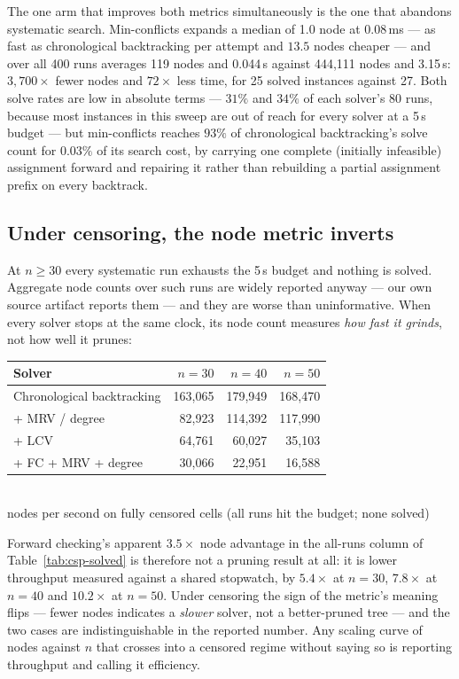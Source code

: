 The one arm that improves both metrics simultaneously is the one that abandons systematic search.
Min-conflicts expands a median of 1.0 node at 0.08\,ms --- as fast as chronological backtracking
per attempt and $13.5$ nodes cheaper --- and over all 400 runs averages 119 nodes and 0.044\,s
against 444,111 nodes and 3.15\,s: $3{,}700\times$ fewer nodes and $72\times$ less time, for
25 solved instances against 27. Both solve rates are low in absolute terms --- $31\%$ and $34\%$ of
each solver's 80 runs, because most instances in this sweep are out of reach for every solver at a
5\,s budget --- but min-conflicts reaches $93\%$ of chronological backtracking's solve count for $0.03\%$ of its
search cost, by carrying one complete (initially infeasible) assignment forward and repairing it
rather than rebuilding a partial assignment prefix on every backtrack.

\subsection{Under censoring, the node metric inverts}

At $n \geq 30$ every systematic run exhausts the 5\,s budget and nothing is solved. Aggregate node
counts over such runs are widely reported anyway --- our own source artifact reports them --- and
they are worse than uninformative. When every solver stops at the same clock, its node count
measures \emph{how fast it grinds}, not how well it prunes:

\begin{center}
\small
\begin{tabular}{@{}lrrr@{}}
\toprule
\textbf{Solver} & \textbf{$n=30$} & \textbf{$n=40$} & \textbf{$n=50$} \\
\midrule
Chronological backtracking & 163,065 & 179,949 & 168,470 \\
\quad + MRV / degree       & \phantom{0}82,923 & 114,392 & 117,990 \\
\quad + LCV                & \phantom{0}64,761 & \phantom{0}60,027 & \phantom{0}35,103 \\
\quad + FC + MRV + degree  & \phantom{0}30,066 & \phantom{0}22,951 & \phantom{0}16,588 \\
\bottomrule
\end{tabular}
\\[2pt]
\footnotesize nodes per second on fully censored cells (all runs hit the budget; none solved)
\end{center}

Forward checking's apparent $3.5\times$ node advantage in the all-runs column of
Table~\ref{tab:csp-solved} is therefore not a pruning result at all: it is lower throughput
measured against a shared stopwatch, by $5.4\times$ at $n = 30$, $7.8\times$ at $n = 40$ and
$10.2\times$ at $n = 50$. Under censoring the sign of the metric's meaning
flips --- fewer nodes indicates a \emph{slower} solver, not a better-pruned tree --- and the two
cases are indistinguishable in the reported number. Any scaling curve of nodes against $n$ that
crosses into a censored regime without saying so is reporting throughput and calling it efficiency.

